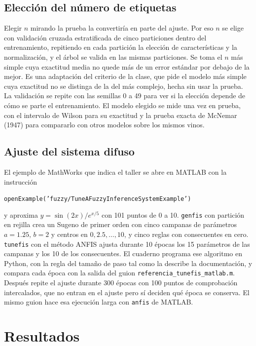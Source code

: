 \documentclass[11pt,letterpaper]{article}
\begin{document}
\subsection{Elección del número de etiquetas}

Elegir $n$ mirando la prueba la convertiría en parte del ajuste. Por eso $n$ se elige con validación cruzada estratificada de cinco particiones dentro del entrenamiento, repitiendo en cada partición la elección de características y la normalización, y el árbol se valida en las mismas particiones. Se toma el $n$ más simple cuya exactitud media no quede más de un error estándar por debajo de la mejor. Es una adaptación del criterio de la clase, que pide el modelo más simple cuya exactitud no se distinga de la del más complejo, hecha sin usar la prueba. La validación se repite con las semillas 0 a 49 para ver si la elección depende de cómo se parte el entrenamiento. El modelo elegido se mide una vez en prueba, con el intervalo de Wilson para su exactitud y la prueba exacta de McNemar (1947) para compararlo con otros modelos sobre los mismos vinos.

\subsection{Ajuste del sistema difuso}

El ejemplo de MathWorks que indica el taller se abre en MATLAB con la instrucción
\begin{center}
\texttt{openExample('fuzzy/TuneAFuzzyInferenceSystemExample')}
\end{center}
y aproxima $y=\sin(2x)/e^{x/5}$ con 101 puntos de 0 a 10. \texttt{genfis} con partición en rejilla crea un Sugeno de primer orden con cinco campanas de parámetros $a=1.25$, $b=2$ y centros en $0, 2.5, \dots, 10$, y cinco reglas con consecuentes en cero. \texttt{tunefis} con el método ANFIS ajusta durante 10 épocas los 15 parámetros de las campanas y los 10 de los consecuentes. El cuaderno programa ese algoritmo en Python, con la regla del tamaño de paso tal como la describe la documentación, y compara cada época con la salida del guion \texttt{referencia\_tunefis\_matlab.m}. Después repite el ajuste durante 300 épocas con 100 puntos de comprobación intercalados, que no entran en el ajuste pero sí deciden qué época se conserva. El mismo guion hace esa ejecución larga con \texttt{anfis} de MATLAB.

\section{Resultados}
\end{document}
